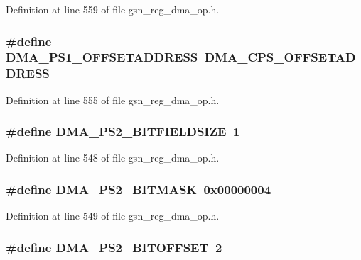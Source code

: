 Definition at line 559 of file gsn\_\-reg\_\-dma\_\-op.h.

\hypertarget{a00547_aaafa59c050b16495d5530d0682380e87}{
\subsubsection[{DMA\_\-PS1\_\-OFFSETADDRESS}]{\setlength{\rightskip}{0pt plus 5cm}\#define DMA\_\-PS1\_\-OFFSETADDRESS~DMA\_\-CPS\_\-OFFSETADDRESS}}
\label{a00547_aaafa59c050b16495d5530d0682380e87}


Definition at line 555 of file gsn\_\-reg\_\-dma\_\-op.h.

\hypertarget{a00547_acc88795653fbe3cbb2f8b52e4415a11b}{
\subsubsection[{DMA\_\-PS2\_\-BITFIELDSIZE}]{\setlength{\rightskip}{0pt plus 5cm}\#define DMA\_\-PS2\_\-BITFIELDSIZE~1}}
\label{a00547_acc88795653fbe3cbb2f8b52e4415a11b}


Definition at line 548 of file gsn\_\-reg\_\-dma\_\-op.h.

\hypertarget{a00547_a98305e718e8fe3559e2d9d0f0d4b70ff}{
\subsubsection[{DMA\_\-PS2\_\-BITMASK}]{\setlength{\rightskip}{0pt plus 5cm}\#define DMA\_\-PS2\_\-BITMASK~0x00000004}}
\label{a00547_a98305e718e8fe3559e2d9d0f0d4b70ff}


Definition at line 549 of file gsn\_\-reg\_\-dma\_\-op.h.

\hypertarget{a00547_ae77308ced0668fa34a3cee8c777d42fa}{
\subsubsection[{DMA\_\-PS2\_\-BITOFFSET}]{\setlength{\rightskip}{0pt plus 5cm}\#define DMA\_\-PS2\_\-BITOFFSET~2}}
\label{a00547_ae77308ced0668fa34a3cee8c777d42fa}


